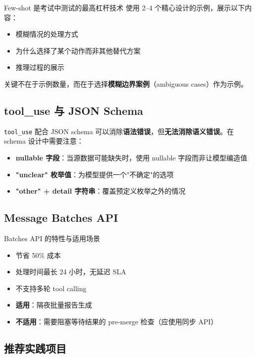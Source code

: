 \documentclass[a4paper]{article}
\begin{document}
\begin{importantbox}{Few-shot 是考试中测试的最高杠杆技术}
使用 2--4 个精心设计的示例，展示以下内容：
\begin{itemize}[leftmargin=1.5em]
    \item 模糊情况的处理方式
    \item 为什么选择了某个动作而非其他替代方案
    \item 推理过程的展示
\end{itemize}
关键不在于示例数量，而在于选择\textbf{模糊边界案例}（ambiguous cases）作为示例。
\end{importantbox}

\subsection{tool\_use 与 JSON Schema}

\texttt{tool\_use} 配合 JSON schema 可以消除\textbf{语法错误}，但\textbf{无法消除语义错误}。在 schema 设计中需要注意：

\begin{itemize}[leftmargin=1.5em]
    \item \textbf{nullable 字段}：当源数据可能缺失时，使用 nullable 字段而非让模型编造值
    \item \textbf{"unclear" 枚举值}：为模型提供一个"不确定"的选项
    \item \textbf{"other" + detail 字符串}：覆盖预定义枚举之外的情况
\end{itemize}

\subsection{Message Batches API}

\begin{knowledgebox}{Batches API 的特性与适用场景}
\begin{itemize}[leftmargin=1.5em]
    \item 节省 50\% 成本
    \item 处理时间最长 24 小时，无延迟 SLA
    \item 不支持多轮 tool calling
    \item \textbf{适用}：隔夜批量报告生成
    \item \textbf{不适用}：需要阻塞等待结果的 pre-merge 检查（应使用同步 API）
\end{itemize}
\end{knowledgebox}

\subsection{推荐实践项目}
\end{document}
